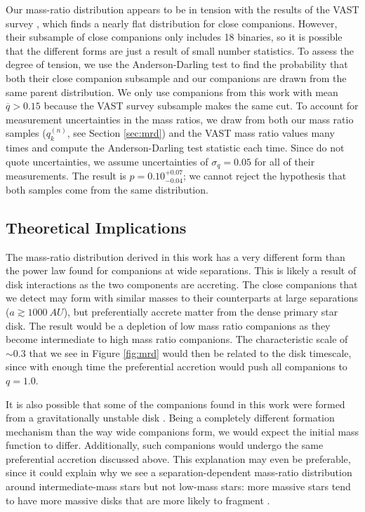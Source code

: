 \documentclass{emulateapj}
\begin{document}
Our mass-ratio distribution appears to be in tension with the results of the VAST survey \citep{DeRosa2014}, which finds a nearly flat distribution for close companions. However, their subsample of close companions only includes 18 binaries, so it is possible that the different forms are just a result of small number statistics. To assess the degree of tension, we use the Anderson-Darling  test \citep{Anderson1954} to find the probability that both their close companion subsample and our companions are drawn from the same parent distribution. We only use companions from this work with mean $\overline{q} > 0.15$ because the VAST survey subsample makes the same cut. To account for measurement uncertainties in the mass ratios, we draw from both our mass ratio samples ($q_k^{(n)}$, see Section \ref{sec:mrd}) and the VAST mass ratio values many times and compute the Anderson-Darling test statistic each time. Since \citet{DeRosa2014} do not quote uncertainties, we assume uncertainties of $\sigma_q = 0.05$ for all of their measurements. The result is $p = 0.10^{+0.07}_{-0.04}$; we cannot reject the hypothesis that both samples come from the same distribution.


\subsection{Theoretical Implications}
\label{subsec:theory}

The mass-ratio distribution derived in this work has a very different form than the power law found for companions at wide separations. This is likely a result of disk interactions as the two components are accreting. The close companions that we detect may form with similar masses to their counterparts at large separations ($a \gtrsim 1000\ AU$), but preferentially accrete matter from the dense primary star disk. The result would be a depletion of low mass ratio companions as they become intermediate to high mass ratio companions. The characteristic scale of $\sim 0.3$ that we see in Figure \ref{fig:mrd} would then be related to the disk timescale, since with enough time the preferential accretion would push all companions to $q = 1.0$. 

It is also possible that some of the companions found in this work were formed from a gravitationally unstable disk \citep[e.g.][]{Kratter2006, Stamatellos2011}. Being a completely different formation mechanism than the way wide companions form, we would expect the initial mass function to differ. Additionally, such companions would undergo the same preferential accretion discussed above. This explanation may even be preferable, since it could explain why we see a separation-dependent mass-ratio distribution around intermediate-mass stars but not low-mass stars: more massive stars tend to have more massive disks \citep{Andrews2013} that are more likely to fragment \citep{Kratter2010}.
\end{document}
